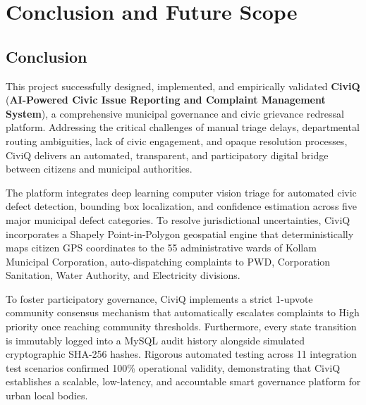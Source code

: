 \documentclass[12pt,a4paper]{report}
\begin{document}
\chapter{Conclusion and Future Scope}

\section{Conclusion}
This project successfully designed, implemented, and empirically validated \textbf{CiviQ} (\textbf{AI-Powered Civic Issue Reporting and Complaint Management System}), a comprehensive municipal governance and civic grievance redressal platform. Addressing the critical challenges of manual triage delays, departmental routing ambiguities, lack of civic engagement, and opaque resolution processes, CiviQ delivers an automated, transparent, and participatory digital bridge between citizens and municipal authorities.

The platform integrates deep learning computer vision triage for automated civic defect detection, bounding box localization, and confidence estimation across five major municipal defect categories. To resolve jurisdictional uncertainties, CiviQ incorporates a Shapely Point-in-Polygon geospatial engine that deterministically maps citizen GPS coordinates to the 55 administrative wards of Kollam Municipal Corporation, auto-dispatching complaints to PWD, Corporation Sanitation, Water Authority, and Electricity divisions.

To foster participatory governance, CiviQ implements a strict 1-upvote community consensus mechanism that automatically escalates complaints to High priority once reaching community thresholds. Furthermore, every state transition is immutably logged into a MySQL audit history alongside simulated cryptographic SHA-256 hashes. Rigorous automated testing across 11 integration test scenarios confirmed 100\% operational validity, demonstrating that CiviQ establishes a scalable, low-latency, and accountable smart governance platform for urban local bodies.
\end{document}
